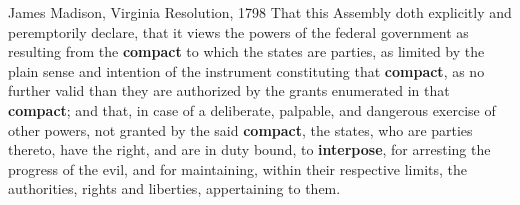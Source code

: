 \begin{frame}{James Madison, Virginia Resolution, 1798}
    That this Assembly doth explicitly and peremptorily declare, that it views
    the powers of the federal government as resulting from the \textbf{
    \color{blue}compact} to which the states are parties, as limited by
    the plain sense and intention of the instrument constituting that
    \textbf{\color{blue}compact}, as no further valid than they are
    authorized by the grants enumerated in that\textbf{ \color{blue}
    compact}; and that, in case of a deliberate, palpable, and dangerous
    exercise of other powers, not granted by the said\textbf{ \color{blue}
    compact}, the states, who are parties thereto, have the right, and are
    in duty bound, to\textbf{ \color{red}interpose}, for arresting the
    progress of the evil, and for maintaining, within their respective
    limits, the authorities, rights and liberties, appertaining to them.  
\end{frame}

